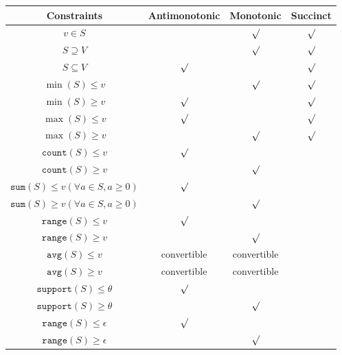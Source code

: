 \documentclass[12pt, openany]{report}
\theoremstyle{definition}
\begin{document}
\begin{center}
    \begin{tabular}{|c|c|c|c|}
        \hline
        Constraints & Antimonotonic & Monotonic & Succinct \\
        \hline  
        \hline
        $v \in S$ &  & $\surd$ & $\surd$ \\
        \hline
        $ S \supseteq V$ &  & $\surd$ & $\surd$ \\
        \hline
        $ S \subseteq V$ & $\surd$ &  & $\surd$ \\
        \hline
        $ \min(S) \leq v$ &  &  $\surd$ & $\surd$  \\
        \hline
        $ \min(S) \geq v$  &  $\surd$ &  & $\surd$ \\
        \hline
        $ \max(S) \leq v$  &  $\surd$ &  & $\surd$ \\
        \hline
        $ \max(S) \geq v$  &  &  $\surd$ & $\surd$ \\
        \hline
        $\texttt{count}(S) \leq v$ & $\surd$ &  & \\
        \hline
        $\texttt{count}(S) \geq v$ &  & $\surd$ &  \\
        \hline
        $\texttt{sum}(S) \leq v (\forall a \in S, a \geq 0)$ & $\surd$ &  &  \\
        \hline
        $\texttt{sum}(S) \geq v (\forall a \in S, a \geq 0)$ &  & $\surd$ &  \\
        \hline
        $\texttt{range}(S) \leq v$ & $\surd$ &  &  \\
        \hline
        $\texttt{range}(S) \geq v$  &  & $\surd$ &  \\
        \hline
        $\texttt{avg}(S) \leq v$ & convertible & convertible &  \\
        \hline
        $\texttt{avg}(S) \geq v$ & convertible & convertible &  \\
        \hline
        $\texttt{support}(S) \leq \theta$  & $\surd$ &  &  \\
        \hline
        $\texttt{support}(S) \geq \theta$  &  & $\surd$ &  \\
        \hline
        $\texttt{range}(S) \leq \epsilon$  & $\surd$ &  &  \\
        \hline
        $\texttt{range}(S) \geq \epsilon$  &  & $\surd$ &  \\
        \hline
    \end{tabular}
\end{center}
\end{document}
